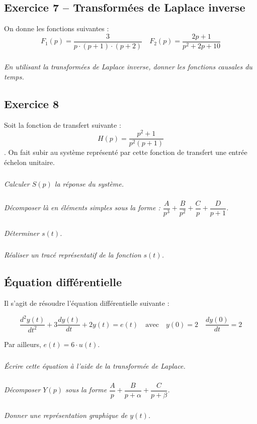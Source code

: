 \documentclass[11pt,oneside]{article}
\begin{document}
\subsection*{Exercice 7 -- Transformées de Laplace inverse}
\setcounter{subparagraph}{0}
On donne les fonctions suivantes : 
$$
F_1(p)= \dfrac{3}{p\cdot \left(p+1\right)\cdot \left(p+2\right)} \quad
F_2(p)= \dfrac{2p +1}{p^2 + 2p + 10} 
$$

\subparagraph{}
\textit{En utilisant la transformées de Laplace inverse, donner les fonctions causales du temps.}

\subsection*{Exercice 8}
\setcounter{subparagraph}{0}
Soit la fonction de transfert suivante : 
$$ H(p) = \dfrac{p^2+1}{p^2\left(p+1\right)}$$. 
On fait subir au système représenté par cette fonction de transfert une entrée échelon unitaire. 

\subparagraph{}
\textit{Calculer $S(p)$ la réponse du système.}

\subparagraph{}
\textit{Décomposer là en éléments simples sous la forme : $\dfrac{A}{p^3}+\dfrac{B}{p^2}+\dfrac{C}{p}+\dfrac{D}{p+1}$.}

\subparagraph{}
\textit{Déterminer $s(t)$.}

\subparagraph{}
\textit{Réaliser un tracé représentatif de la fonction $s(t)$.}


\subsection*{Équation différentielle}
\setcounter{subparagraph}{0}
Il s'agit de résoudre l'équation différentielle suivante : 

$$
\dfrac{d^2y(t)}{dt^2}+3\dfrac{dy(t)}{dt}+2y(t) = e(t) \quad \text{avec} \quad y(0)=2\quad \dfrac{dy(0)}{dt}=2
$$

Par ailleurs, $e(t)=6\cdot u(t)$.

\subparagraph{}
\textit{Écrire cette équation à l'aide de la transformée de Laplace.}


\subparagraph{}
\textit{Décomposer $Y(p)$ sous la forme $\dfrac{A}{p}+\dfrac{B}{p+\alpha}+\dfrac{C}{p+\beta}$.}

\subparagraph{}
\textit{Donner une représentation graphique de $y(t)$.}




%
\end{document}
